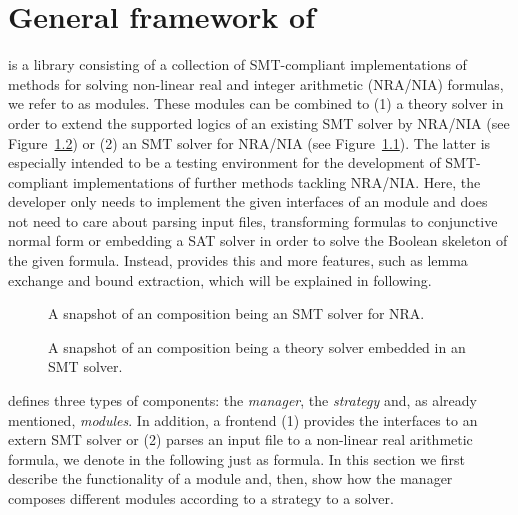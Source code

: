 \chapter{General framework of \smtrat}
\label{chapter:generalframework}
\smtrat is a \Cpp library consisting of a collection of
SMT-compliant implementations of methods for solving non-linear real
and integer arithmetic (NRA/NIA) formulas, we refer to as modules. These modules can be 
combined to (1) a theory solver in order to extend the supported logics of an
existing SMT solver by NRA/NIA (see Figure~\ref{fig:frameworkb}) or (2) an SMT 
solver for NRA/NIA (see Figure~\ref{fig:frameworka}). The latter is 
especially intended to be a testing environment for the development 
of SMT-compliant implementations of further methods tackling NRA/NIA. Here,
the developer only needs to implement the given interfaces of an \smtrat 
module and does not need to care about parsing input files, transforming
formulas to conjunctive normal form or embedding a SAT solver in order
to solve the Boolean skeleton of the given formula. Instead, \smtrat
provides this and more features, such as lemma exchange and bound
extraction, which will be explained in following.

\begin{figure}[ht]
\caption{A snapshot of an \smtrat composition being an SMT solver for NRA.}
\begin{center}

\end{center}
\label{fig:frameworka}
\end{figure}

\begin{figure}[ht]
\caption{A snapshot of an \smtrat composition being a theory solver embedded in an SMT solver.}
\begin{center}

\end{center}
\label{fig:frameworkb}
\end{figure}

\smtrat defines three types of components: the \emph{manager}, the \emph{strategy} and, as already mentioned, \emph{modules}. 
In addition, a frontend (1) provides the interfaces to an extern SMT 
solver or (2) parses an input file to a non-linear real arithmetic 
formula, we denote in the following just as formula.
In this section we first describe the functionality of a module and,
then, show how the manager composes different modules according to a
strategy to a solver.

